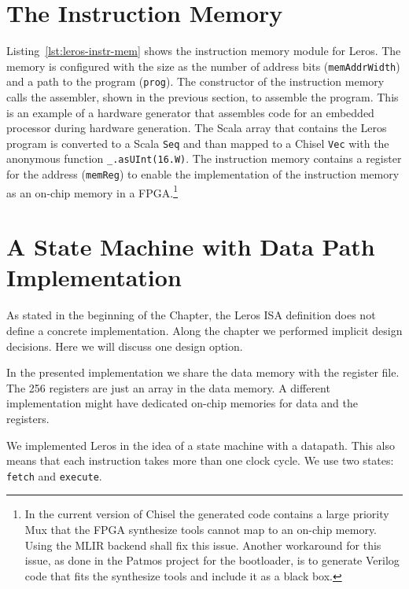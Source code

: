 \documentclass[%
    10pt,
    headinclude, footexclude,
    openright, %
    notitlepage,
    cleardoubleempty,
    headsepline,
    pointlessnumbers,
    bibtotoc, idxtotoc,
    ]{scrbook}
\newcommand{\code}[1]{{\small{\texttt{#1}}}}
\begin{document}



\section{The Instruction Memory}

Listing~\ref{lst:leros-instr-mem} shows the instruction memory module for Leros.
The memory is configured with the size as the number of address bits (\code{memAddrWidth}) and
a path to the program (\code{prog}). The constructor of the instruction memory calls the
assembler, shown in the previous section, to assemble the program.
This is an example of a hardware generator that assembles code for an
embedded processor during hardware generation.
The Scala array that contains the Leros program is converted to a Scala
\code{Seq} and than mapped to a Chisel \code{Vec} with the anonymous
function \code{\_.asUInt(16.W)}.
The instruction memory contains a register for the address (\code{memReg})
to enable the implementation of the instruction memory as an on-chip memory
in a FPGA.\footnote{In the current version of Chisel the generated code
contains a large priority Mux that the FPGA synthesize tools cannot map to
an on-chip memory. Using the MLIR backend shall fix this issue.
Another workaround for this issue, as done in the Patmos project for the
bootloader, is to generate Verilog code that fits the synthesize tools
and include it as a black box.}




\section{A State Machine with Data Path Implementation}

As stated in the beginning of the Chapter, the Leros ISA definition does not define a
concrete implementation. Along the chapter we performed implicit design decisions.
Here we will discuss one design option.

In the presented implementation we share the data memory with the register file.
The 256 registers are just an array in the data memory. A different implementation might
have dedicated on-chip memories for data and the registers.

We implemented Leros in the idea of a state machine with a datapath.
This also means that each instruction takes more than one clock cycle.
We use two states: \code{fetch} and \code{execute}.
\end{document}
